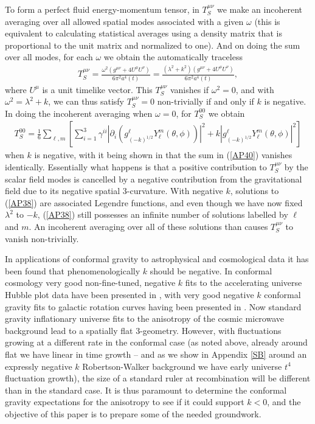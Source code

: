 \documentclass[aps]{revtex4}
\begin{document}
To form a perfect fluid energy-momentum tensor, in $T^{\mu\nu}_S$ we make an incoherent averaging over all allowed spatial modes associated with a given $\omega$  (this is equivalent to calculating statistical averages using a density matrix that is proportional to the unit matrix and normalized to one). And on doing the sum over all modes,  for each $\omega$ we obtain  \cite{Mannheim2000} the automatically traceless
%
\begin{eqnarray}
T_S^{\mu\nu}=\frac{\omega^2(g^{\mu\nu}+4U^{\mu}U^{\nu})}{6\pi^2a^4(t)}=
\frac{(\lambda^2+k^2)(g^{\mu\nu}+4U^{\mu}U^{\nu})}{6\pi^2a^4(t)},
\label{AP39}
\end{eqnarray}
%
where $U^{\mu}$ is a unit timelike vector. This $T^{\mu\nu}_S$ vanishes if $\omega^2=0$, and with $\omega^2=\lambda^2+k$, we can thus satisfy $T^{\mu\nu}_S=0$ non-trivially  if and only if $k$ is negative. In doing the incoherent averaging when $\omega=0$, for $T^{00}_S$ we obtain
%
\begin{eqnarray}
T_S^{00}=\frac{1}{6}\sum_{\ell,m}\left[\sum _{i=1}^3\gamma^{ii}|\partial_i(g^{\ell}_{(-k)^{1/2}}Y^{m}_{\ell}(\theta,\phi))|^2+k|g^{\ell}_{(-k)^{1/2}}Y^{m}_{\ell}(\theta,\phi)|^2\right]
\label{AP40}
\end{eqnarray}
%
when $k$ is negative, with it being shown in \cite{Mannheim2000} that the sum in (\ref{AP40}) vanishes identically. Essentially what happens is that a positive contribution to $T^{\mu\nu}_S$ by the scalar field modes is cancelled by a negative contribution from the gravitational field due to its negative spatial 3-curvature. With negative $k$, solutions to (\ref{AP38}) are associated Legendre functions, and even though we have now fixed $\lambda^2$ to $-k$, (\ref{AP38}) still possesses an infinite number of solutions labelled by $\ell$ and $m$. An incoherent averaging over all of these solutions than causes $T^{\mu\nu}_S$ to vanish non-trivially.

In applications of conformal gravity to astrophysical and cosmological data it has been found that phenomenologically $k$ should be negative. In conformal cosmology very good non-fine-tuned, negative $k$  fits to the accelerating universe Hubble plot data have been presented in \cite{Mannheim2006,Mannheim2017},  with very good negative  $k$ conformal gravity fits to galactic rotation curves having been presented in \cite{Mannheim2006,Mannheim2017}.  Now standard gravity inflationary universe fits to the anisotropy of the cosmic microwave background lead to a spatially flat 3-geometry. However, with fluctuations growing at a different rate in the conformal case (as noted above, already around flat we have linear in time growth -- and as we show in  Appendix \ref{SB}  around an expressly negative $k$ Robertson-Walker background we have early universe $t^4$ fluctuation growth), the size of a standard ruler at recombination will be different than in the standard case. It is thus paramount to determine the conformal gravity expectations for the anisotropy to see if it could support $k<0$, and the objective of this paper is to prepare some of the needed groundwork.
\end{document}
